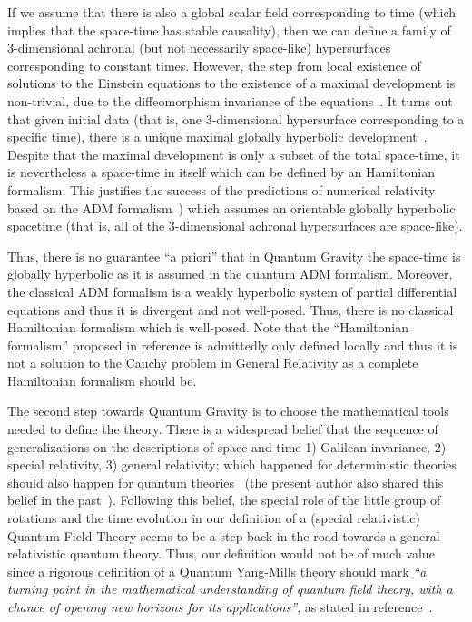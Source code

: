 \documentclass[11pt]{book}
\begin{document}
If we assume that there is also a global scalar field corresponding to
time (which implies that the space-time has stable
causality\cite{Geroch1979Global}), then we can define a family of 3-dimensional achronal
(but not necessarily space-like) hypersurfaces corresponding to constant
times\cite{Geroch1979Global}. However, the step from local existence of solutions to the
Einstein equations to the existence of a maximal development is
non-trivial, due to the diffeomorphism invariance of the
equations~\cite{Ringstruxf6m2009cauchy}\cite{Kiriushcheva2011Hamiltonian}. It turns out that given initial data (that is, one
3-dimensional hypersurface corresponding to a specific time), there is a
unique maximal globally hyperbolic
development~\cite{Ringstruxf6m2009cauchy}. Despite that the maximal development is only a subset of the
total space-time, it is nevertheless a space-time in itself which can be
defined by an Hamiltonian formalism. This justifies the success of the
predictions of numerical relativity based on the ADM
formalism~\cite{Charap1988Explicit}\cite{Deser1976Canonical}) which assumes an orientable globally hyperbolic spacetime
(that is, all of the 3-dimensional achronal hypersurfaces are
space-like).

Thus, there is no guarantee ``a priori'' that in Quantum Gravity the
space-time is globally hyperbolic as it is assumed in the quantum ADM
formalism. Moreover, the classical ADM formalism is a weakly hyperbolic
system of partial differential equations and thus it is divergent and
not
well-posed\cite{Kiriushcheva2011Hamiltonian}. Thus, there is no classical Hamiltonian formalism
which is well-posed. Note that the ``Hamiltonian formalism'' proposed in
reference\cite{Kiriushcheva2011Hamiltonian} is admittedly only defined locally and thus it is not
a solution to the Cauchy problem in General Relativity as a complete
Hamiltonian formalism should be.

The second step towards Quantum Gravity is to choose the mathematical
tools needed to define the theory. There is a widespread belief that the
sequence of generalizations on the descriptions of space and time 1)
Galilean invariance, 2) special relativity, 3) general relativity; which
happened for deterministic theories should also happen for quantum
theories~\cite{Isham1992Canonical} (the
present author also shared this belief in the
past~\cite{Pedro2015Scalar}). Following
this belief, the special role of the little group of rotations and the
time evolution in our definition of a (special relativistic) Quantum
Field Theory seems to be a step back in the road towards a general
relativistic quantum theory. Thus, our definition would not be of much
value since a rigorous definition of a Quantum Yang-Mills theory should
mark \emph{``a turning point in the mathematical understanding of
quantum field theory, with a chance of opening new horizons for its
applications''}, as stated in
reference~\cite{Jaffe2006Quantum}.
\end{document}
